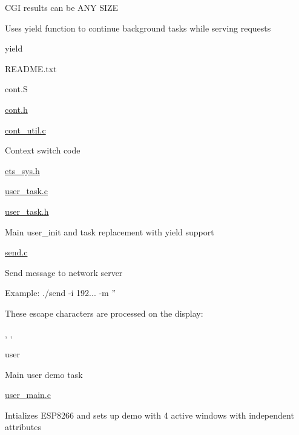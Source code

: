 \begin{DoxyItemize}
\begin{DoxyItemize}
\begin{DoxyItemize}
\begin{DoxyItemize}
\begin{DoxyItemize}
\end{DoxyItemize}
\end{DoxyItemize}
\item C\-G\-I results can be A\-N\-Y S\-I\-Z\-E
\item Uses yield function to continue background tasks while serving requests
\end{DoxyItemize}
\end{DoxyItemize}
\item yield
\begin{DoxyItemize}
\item R\-E\-A\-D\-M\-E.\-txt
\item cont.\-S
\item \hyperlink{cont_8h}{cont.\-h}
\item \hyperlink{cont__util_8c}{cont\-\_\-util.\-c}
\begin{DoxyItemize}
\item Context switch code
\end{DoxyItemize}
\item \hyperlink{ets__sys_8h}{ets\-\_\-sys.\-h}
\item \hyperlink{user__task_8c}{user\-\_\-task.\-c}
\item \hyperlink{user__task_8h}{user\-\_\-task.\-h}
\begin{DoxyItemize}
\item Main user\-\_\-init and task replacement with yield support
\end{DoxyItemize}
\end{DoxyItemize}
\item \hyperlink{send_8c}{send.\-c}
\begin{DoxyItemize}
\item Send message to network server
\item Example\-: ./send -\/i 192... -\/m ''
\begin{DoxyItemize}
\item These escape characters are processed on the display\-: \par
, , 
\end{DoxyItemize}
\end{DoxyItemize}
\item user
\begin{DoxyItemize}
\item Main user demo task
\item \hyperlink{user__main_8c}{user\-\_\-main.\-c}
\begin{DoxyItemize}
\item Intializes E\-S\-P8266 and sets up demo with 4 active windows with independent attributes
\end{DoxyItemize}
\end{DoxyItemize}
\end{DoxyItemize}

